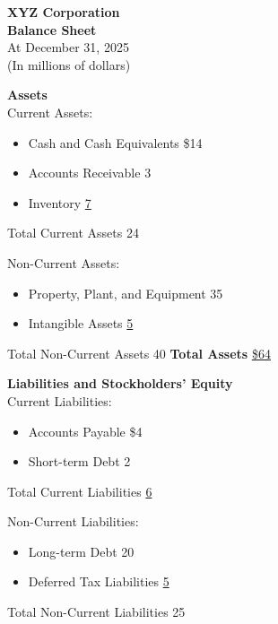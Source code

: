\small
\begin{tcolorbox}[colframe=black,colback=white,title=Example Balance Sheet (Classified by Current \& Non-current)]
    \begin{center}
        \textbf{XYZ Corporation}\\
        \textbf{Balance Sheet}\\
        At December 31, 2025\\
        (In millions of dollars)
    \end{center}

    \begin{multicols}{2}
        \textbf{Assets}\\
        Current Assets:
        \begin{itemize}
            \item Cash and Cash Equivalents \hfill \$14
            \item Accounts Receivable \hfill 3
            \item Inventory \hfill \underline{7}
        \end{itemize}
        Total Current Assets \hfill 24

        Non-Current Assets:
        \begin{itemize}
            \item Property, Plant, and Equipment \hfill 35
            \item Intangible Assets \hfill \underline{5}
        \end{itemize}
        Total Non-Current Assets \hfill 40
        \vfill
        \textbf{Total Assets} \hfill \underline{\underline{\$64}}


        \columnbreak

        \textbf{Liabilities and Stockholders' Equity}\\
        Current Liabilities:
        \begin{itemize}
            \item Accounts Payable \hfill \$4
            \item Short-term Debt \hfill 2
        \end{itemize}
        Total Current Liabilities \hfill \underline{6}

        Non-Current Liabilities:
        \begin{itemize}
            \item Long-term Debt \hfill 20
            \item Deferred Tax Liabilities \hfill \underline{5}
        \end{itemize}
        Total Non-Current Liabilities \hfill 25


\end{multicols}
\end{tcolorbox}
